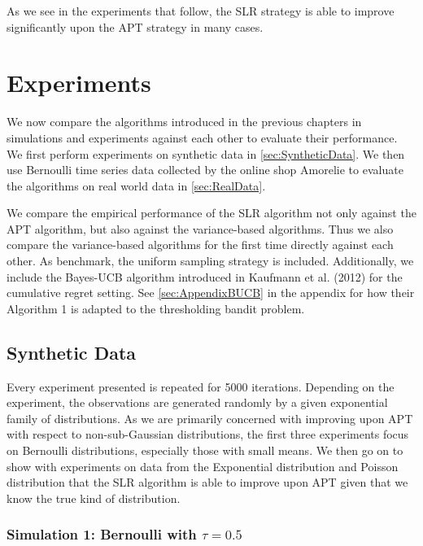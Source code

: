 \documentclass[11pt,]{article}
\begin{document}
As we see in the experiments that follow, the SLR strategy is able to
improve significantly upon the APT strategy in many cases.

\section{\texorpdfstring{Experiments
\label{chap:Experiments}}{Experiments }}\label{experiments}

We now compare the algorithms introduced in the previous chapters in
simulations and experiments against each other to evaluate their
performance. We first perform experiments on synthetic data in
\autoref{sec:SyntheticData}. We then use Bernoulli time series data
collected by the online shop Amorelie to evaluate the algorithms on real
world data in \autoref{sec:RealData}.

We compare the empirical performance of the SLR algorithm not only
against the APT algorithm, but also against the variance-based
algorithms. Thus we also compare the variance-based algorithms for the
first time directly against each other. As benchmark, the uniform
sampling strategy is included. Additionally, we include the Bayes-UCB
algorithm introduced in Kaufmann et al. (2012) for the cumulative regret
setting. See \autoref{sec:AppendixBUCB} in the appendix for how their
Algorithm 1 is adapted to the thresholding bandit problem.

\subsection{\texorpdfstring{Synthetic Data
\label{sec:SyntheticData}}{Synthetic Data }}\label{synthetic-data}

Every experiment presented is repeated for 5000 iterations. Depending on
the experiment, the observations are generated randomly by a given
exponential family of distributions. As we are primarily concerned with
improving upon APT with respect to non-sub-Gaussian distributions, the
first three experiments focus on Bernoulli distributions, especially
those with small means. We then go on to show with experiments on data
from the Exponential distribution and Poisson distribution that the SLR
algorithm is able to improve upon APT given that we know the true kind
of distribution.

\subsubsection{\texorpdfstring{Simulation 1: Bernoulli with
\(\tau = 0.5\)}{Simulation 1: Bernoulli with \textbackslash{}tau = 0.5}}\label{simulation-1-bernoulli-with-tau-0.5}
\end{document}
